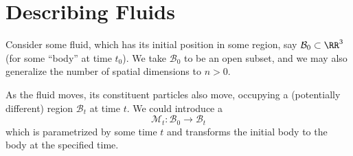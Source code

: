 \section{Describing Fluids}

\begin{node}\label{fluids:describing-0000}%
Consider some fluid, which has its initial position in some region, say
$\mathcal{B}_{0}\subset\RR^{3}$ (for some ``body'' at time $t_{0}$). We
take $\mathcal{B}_{0}$ to be an open subset, and we may also generalize
the number of spatial dimensions to $n>0$.
\end{node}

\begin{node}\label{fluids:describing-0001}%
As the fluid moves, its constituent particles also move, occupying a
(potentially different) region $\mathcal{B}_{t}$ at time $t$. We could
introduce a 
\begin{equation*}
\mathcal{M}_{t}\colon\mathcal{B}_{0}\to\mathcal{B}_{t}
\end{equation*}
which is parametrized by some time $t$ and transforms the initial body
to the body at the specified time.
\end{node}

